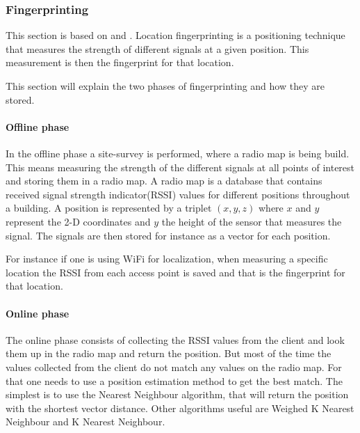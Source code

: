 \subsubsection{Fingerprinting}\label{fingerprinting}
This section is based on \citet{fingerprinting_slides} and \citet{fingerprinting}.
Location fingerprinting is a positioning technique that measures the strength of different signals at a given position.
This measurement is then the fingerprint for that location.

This section will explain the two phases of fingerprinting and how they are stored.
\paragraph{Offline phase}
In the offline phase a site-survey is performed, where a radio map is being build.
This means measuring the strength of the different signals at all points of interest and storing them in a radio map.
A radio map is a database that contains received signal strength indicator(RSSI) values for different positions throughout a building.
A position is represented by a triplet $(x,y,z)$ where $x$ and $y$ represent the 2-D coordinates and $y$ the height of the sensor that measures the signal.
The signals are then stored for instance as a vector for each position.

For instance if one is using WiFi for localization, when measuring a specific location the RSSI from each access point is saved and that is the fingerprint for that location.

\paragraph{Online phase}
The online phase consists of collecting the RSSI values from the client and look them up in the radio map and return the position.
But most of the time the values collected from the client do not match any values on the radio map.
For that one needs to use a position estimation method to get the best match.
The simplest is to use the Nearest Neighbour algorithm, that will return the position with the shortest vector distance.
Other algorithms useful are Weighed K Nearest Neighbour and K Nearest Neighbour.

